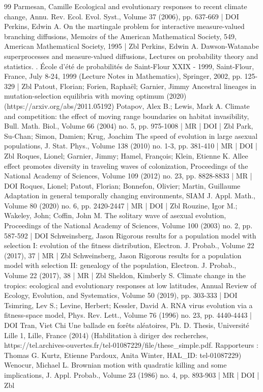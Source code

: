\documentclass[10pt]{amsart}
\theoremstyle{definition}\newtheorem{defi}[theo]{Definition}\newtheorem{rema}[theo]{Remark}\newtheorem{exam}[theo]{Example}\newtheorem{exem}[theo]{Example}\newtheorem{nota}[theo]{Notation}
\begin{document}
\begin{thebibliography}{99}
Parmesan, Camille Ecological and evolutionary responses to recent climate change, Annu. Rev. Ecol. Evol. Syst., Volume 37 (2006), pp. 637-669 | DOI
Perkins, Edwin A. On the martingale problem for interactive measure-valued branching diffusions, Memoirs of the American Mathematical Society, 549, American Mathematical Society, 1995 | Zbl
Perkins, Edwin A. Dawson-Watanabe superprocesses and measure-valued diffusions, Lectures on probability theory and statistics. . École d’été de probabilités de Saint-Flour XXIX - 1999, Saint-Flour, France, July 8-24, 1999 (Lecture Notes in Mathematics), Springer, 2002, pp. 125-329 | Zbl
Patout, Florian; Forien, Raphaël; Garnier, Jimmy Ancestral lineages in mutation-selection equilibria with moving optimum (2020) (https://arxiv.org/abs/2011.05192)
Potapov, Alex B.; Lewis, Mark A. Climate and competition: the effect of moving range boundaries on habitat invasibility, Bull. Math. Biol., Volume 66 (2004) no. 5, pp. 975-1008 | MR | DOI | Zbl
Park, Su-Chan; Simon, Damien; Krug, Joachim The speed of evolution in large asexual populations, J. Stat. Phys., Volume 138 (2010) no. 1-3, pp. 381-410 | MR | DOI | Zbl
Roques, Lionel; Garnier, Jimmy; Hamel, François; Klein, Etienne K. Allee effect promotes diversity in traveling waves of colonization, Proceedings of the National Academy of Sciences, Volume 109 (2012) no. 23, pp. 8828-8833 | MR | DOI
Roques, Lionel; Patout, Florian; Bonnefon, Olivier; Martin, Guillaume Adaptation in general temporally changing environments, SIAM J. Appl. Math., Volume 80 (2020) no. 6, pp. 2420-2447 | MR | DOI | Zbl
Rouzine, Igor M.; Wakeley, John; Coffin, John M. The solitary wave of asexual evolution, Proceedings of the National Academy of Sciences, Volume 100 (2003) no. 2, pp. 587-592 | DOI
Schweinsberg, Jason Rigorous results for a population model with selection I: evolution of the fitness distribution, Electron. J. Probab., Volume 22 (2017), 37 | MR | Zbl
Schweinsberg, Jason Rigorous results for a population model with selection II: genealogy of the population, Electron. J. Probab., Volume 22 (2017), 38 | MR | Zbl
Sheldon, Kimberly S. Climate change in the tropics: ecological and evolutionary responses at low latitudes, Annual Review of Ecology, Evolution, and Systematics, Volume 50 (2019), pp. 303-333 | DOI
Tsimring, Lev S.; Levine, Herbert; Kessler, David A. RNA virus evolution via a fitness-space model, Phys. Rev. Lett., Volume 76 (1996) no. 23, pp. 4440-4443 | DOI
Tran, Viet Chi Une ballade en forêts aléatoires, Ph. D. Thesis, Université Lille 1, Lille, France (2014) (Habilitation à diriger des recherches, https://tel.archives-ouvertes.fr/tel-01087229/file/these\_simple.pdf. Rapporteurs : Thomas G. Kurtz, Etienne Pardoux, Anita Winter, HAL\_ID: tel-01087229)
Wenocur, Michael L. Brownian motion with quadratic killing and some implications, J. Appl. Probab., Volume 23 (1986) no. 4, pp. 893-903 | MR | DOI | Zbl
\end{thebibliography}
\end{document}
